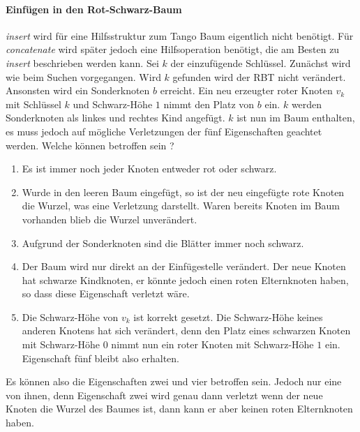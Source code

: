 \documentclass[a4paper,12pt]{article}
\begin{document}
\paragraph{Einfügen in den Rot-Schwarz-Baum}
\textit{insert} wird für eine Hilfsstruktur zum Tango Baum eigentlich nicht benötigt. Für \textit{concatenate} wird später jedoch eine Hilfsoperation benötigt, die am Besten zu \textit{insert} beschrieben werden kann.
Sei $k$ der einzufügende Schlüssel. Zunächst wird wie beim Suchen vorgegangen. Wird $k$ gefunden wird der RBT nicht verändert. Ansonsten wird ein Sonderknoten $b$ erreicht. Ein neu erzeugter roter Knoten $v_k$ mit Schlüssel $k$ und Schwarz-Höhe $1$ nimmt den Platz von $b$ ein. $k$ werden Sonderknoten als linkes und rechtes Kind angefügt. $k$ ist nun im Baum enthalten, es muss jedoch auf mögliche Verletzungen der fünf Eigenschaften geachtet werden. Welche können betroffen sein ?

\begin{enumerate}
	\item Es ist immer noch jeder Knoten entweder rot oder schwarz.
	\item Wurde in den leeren Baum eingefügt, so ist der neu eingefügte rote Knoten die Wurzel, was eine Verletzung darstellt.  Waren bereits Knoten im Baum vorhanden blieb die Wurzel unverändert.
	\item Aufgrund der Sonderknoten sind die Blätter immer noch schwarz.
	\item Der Baum wird nur direkt an der Einfügestelle verändert. Der neue Knoten hat schwarze Kindknoten, er könnte jedoch einen roten Elternknoten haben, so dass diese Eigenschaft verletzt wäre.
	\item Die Schwarz-Höhe von $v_k$ ist korrekt gesetzt. Die Schwarz-Höhe keines anderen Knotens hat sich verändert, denn den Platz eines schwarzen Knoten mit Schwarz-Höhe $0$ nimmt nun ein roter Knoten mit Schwarz-Höhe $1$ ein. Eigenschaft fünf bleibt also erhalten. 
\end{enumerate}  

\noindent Es können also die Eigenschaften zwei und vier betroffen sein. Jedoch nur eine von ihnen, denn Eigenschaft zwei wird genau dann verletzt wenn der neue Knoten die Wurzel des Baumes ist, dann kann er aber keinen roten Elternknoten haben.
\end{document}

